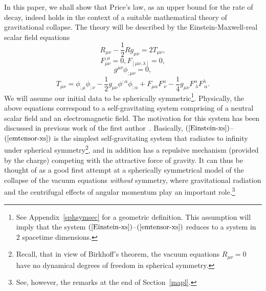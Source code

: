 \documentclass{article}
\begin{document}
In this paper, we shall show that Price's law, as an upper bound for
the rate of decay, indeed holds in the context of a suitable mathematical
theory of gravitational collapse.
The theory will be described by the Einstein-Maxwell-real scalar field equations  
\begin{equation}
\label{Einstein-xs}
R_{\mu\nu}-\frac12Rg_{\mu\nu}=2T_{\mu\nu},
\end{equation}
\begin{equation}
\label{Maxwell-xs}
F^{,\mu}_{\mu\nu}=0, F_{[\mu\nu,\lambda]}=0,
\end{equation}
\begin{equation}
\label{sf-xs}
g^{\mu\nu}\phi_{;\mu\nu}=0,
\end{equation}
\begin{equation}
\label{emtensor-xs}
T_{\mu\nu}=\phi_{;\mu}\phi_{;\nu}
-\frac12g_{\mu\nu}\phi^{;\alpha}\phi_{;\alpha}
+F_{\mu\alpha}F^{\alpha}_{\ \nu}-\frac14g_{\mu\nu}F^{\alpha}_{\ \lambda}
F^{\lambda}_{\ \alpha}.
\end{equation}
We will assume our initial data to be spherically symmetric\footnote{See Appendix~\ref{sphsymsec} 
for a geometric definition. This assumption 
will imply that the system $(\ref{Einstein-xs})$--$(\ref{emtensor-xs})$
reduces to a system in $2$ spacetime dimensions.}.
Physically, the above equations correspond to a self-gravitating system comprising
of a neutral scalar field and an electromagnetic field.
The motivation for this system has been discussed in previous work of 
the first author~\cite{md:si, md:cbh}. 
Basically, $(\ref{Einstein-xs})$--$(\ref{emtensor-xs})$ 
is the simplest self-gravitating system
that radiates to infinity under spherical symmetry\footnote{Recall, that in view
of Birkhoff's theorem, the vacuum equations $R_{\mu\nu}=0$ have no dynamical degrees of freedom in
spherical symmetry.}, and in addition has a repulsive mechanism (provided by the charge) 
competing with the attractive force of gravity. It can thus be thought of as a good 
first attempt at a spherically symmetrical
model of the collapse of the vacuum equations \emph{without} symmetry, 
where gravitational radiation and the centrifugal effects of angular momentum play
an important role.\footnote{See, however, the remarks at the end of Section~\ref{mapl}.} 
\end{document}
